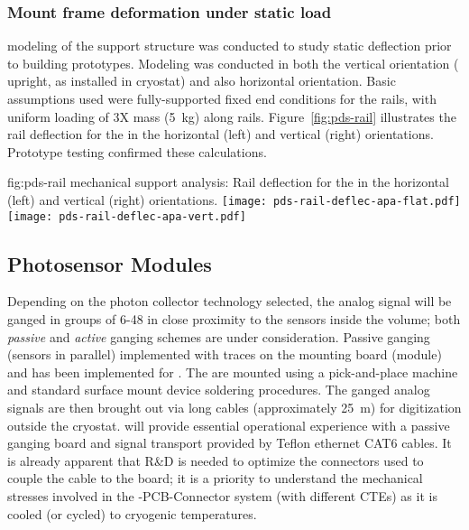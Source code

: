 \subsubsection{ Mount frame deformation under static  load}

 modeling of the  support structure was conducted to study static deflection 
prior to building prototypes.  Modeling was conducted in both the vertical
 orientation ( upright, as installed in cryostat) and also horizontal orientation.  
Basic assumptions used were fully-supported fixed end conditions for the rails, 
with uniform loading of 3X  mass (\SI{5}{kg}) along rails.  
Figure~\ref{fig:pds-rail} illustrates the rail deflection for the  in the horizontal (left) and vertical (right) orientations.
Prototype testing confirmed these calculations.

\begin{dunefigure}{fig:pds-rail}
{ mechanical support analysis: Rail deflection for the  in the horizontal (left) and vertical (right) orientations.}
	\texttt{[image: pds-rail-deflec-apa-flat.pdf]} 
	\texttt{[image: pds-rail-deflec-apa-vert.pdf]}\\
\end{dunefigure}


\subsection{Photosensor Modules}
\label{sec:fdsp-pd-assy-psm}

Depending on the photon collector  technology selected, the  analog signal will be ganged in groups of 6-48 in close proximity to the sensors inside the
\lar volume; both {\it passive} and {\it active} ganging schemes are under consideration.  Passive ganging (sensors in parallel) implemented with traces on the  mounting board (module) and has been implemented for .  The  are mounted using a pick-and-place machine and standard surface mount device soldering procedures. 
 The ganged analog signals are then brought out via long cables (approximately \SI{25}{m}) for digitization outside the cryostat.
  will provide essential operational experience with a passive ganging board and signal transport provided by Teflon ethernet CAT6 cables.
It is already apparent that R\&D is needed to optimize the connectors used to couple the cable to the board;  it is a priority to understand the 
mechanical stresses involved in the -PCB-Connector system (with different CTEs) as it is cooled (or cycled) to cryogenic temperatures.
 
